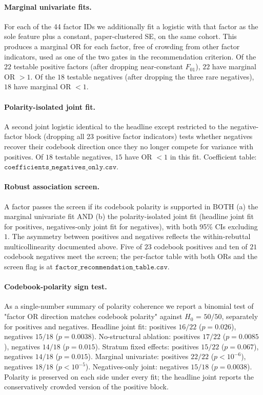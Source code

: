 \documentclass{article}
\newcommand{\code}[1]{\texttt{#1}}
\begin{document}
\paragraph{Marginal univariate fits.} For each of the 44 factor IDs we additionally fit a logistic with that factor as the sole feature plus a constant, paper-clustered SE, on the same cohort. This produces a marginal OR for each factor, free of crowding from other factor indicators, used as one of the two gates in the recommendation criterion. Of the $22$ testable positive factors (after dropping near-constant $F_{01}$), $22$ have marginal OR $> 1$. Of the $18$ testable negatives (after dropping the three rare negatives), $18$ have marginal OR $< 1$.

\paragraph{Polarity-isolated joint fit.} A second joint logistic identical to the headline except restricted to the negative-factor block (dropping all 23 positive factor indicators) tests whether negatives recover their codebook direction once they no longer compete for variance with positives. Of $18$ testable negatives, $15$ have OR $< 1$ in this fit. Coefficient table: $\code{coefficients\_negatives\_only.csv}$.

\paragraph{Robust association screen.} A factor passes the screen if its codebook polarity is supported in BOTH (a) the marginal univariate fit AND (b) the polarity-isolated joint fit (headline joint fit for positives, negatives-only joint fit for negatives), with both 95\% CIs excluding $1$. The asymmetry between positives and negatives reflects the within-rebuttal multicollinearity documented above. Five of $23$ codebook positives and ten of $21$ codebook negatives meet the screen; the per-factor table with both ORs and the screen flag is at $\code{factor\_recommendation\_table.csv}$.

\paragraph{Codebook-polarity sign test.} As a single-number summary of polarity coherence we report a binomial test of "factor OR direction matches codebook polarity" against $H_0$ = $50/50$, separately for positives and negatives. Headline joint fit: positives $16/22$ ($p = 0.026$), negatives $15/18$ ($p = 0.0038$). No-structural ablation: positives $17/22$ ($p = 0.0085$), negatives $14/18$ ($p = 0.015$). Stratum fixed effects: positives $15/22$ ($p = 0.067$), negatives $14/18$ ($p = 0.015$). Marginal univariate: positives $22/22$ ($p < 10^{-6}$), negatives $18/18$ ($p < 10^{-5}$). Negatives-only joint: negatives $15/18$ ($p = 0.0038$). Polarity is preserved on each side under every fit; the headline joint reports the conservatively crowded version of the positive block.
\end{document}
